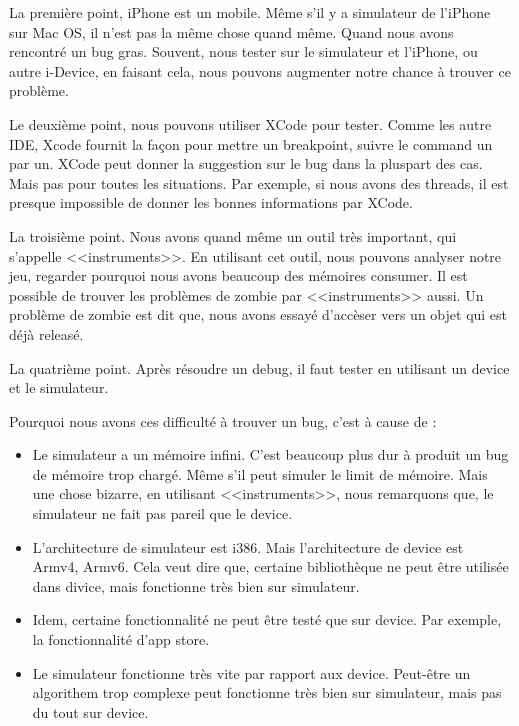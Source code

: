 La première point, iPhone est un mobile. Même s'il y a simulateur de l'iPhone sur Mac OS, il n'est pas la même chose quand même. Quand nous avons rencontré un bug gras. Souvent, nous tester sur le simulateur et l'iPhone, ou autre i-Device, en faisant cela, nous pouvons augmenter notre chance à trouver ce problème. 

Le deuxième point, nous pouvons utiliser XCode pour tester. Comme les autre IDE, Xcode fournit la façon pour mettre un breakpoint, suivre le command un par un. XCode peut donner la suggestion sur le bug dans la pluspart des cas. Mais pas pour toutes les situations. Par exemple, si nous avons des threads, il est presque impossible de donner les bonnes informations par XCode. 

La troisième point. Nous avons quand même un outil très important, qui s'appelle <<instruments>>. En utilisant cet outil, nous pouvons analyser notre jeu, regarder pourquoi nous avons beaucoup des mémoires consumer. Il est possible de trouver les problèmes de zombie par <<instruments>> aussi. Un problème de zombie est dit que, nous avons essayé d'accèser vers un objet qui est déjà releasé.

La quatrième point. Après résoudre un debug, il faut tester en utilisant un device et le simulateur. 

Pourquoi nous avons ces difficulté à trouver un bug, c'est à cause de :

\begin{itemize}
	\item Le simulateur a un mémoire infini. C'est beaucoup plus dur à produit un bug de mémoire trop chargé. Même s'il peut simuler le limit de mémoire. Mais une chose bizarre, en utilisant <<instruments>>, nous remarquons que, le simulateur ne fait pas pareil que le device. 
	\item L'architecture de simulateur est i386. Mais l'architecture de device est Armv4, Armv6. Cela veut dire que, certaine bibliothèque ne peut être utilisée dans divice, mais fonctionne très bien sur simulateur.
	\item Idem, certaine fonctionnalité ne peut être testé que sur device. Par exemple, la fonctionnalité d'app store. 
	\item Le simulateur fonctionne très vite par rapport aux device. Peut-être un algorithem trop complexe peut fonctionne très bien sur simulateur, mais pas du tout sur device. 
\end{itemize}


